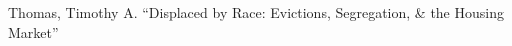 

\begin{cventries}

  \cventry
    { } %
{ } %
    { } %
    { } %
    {
      \begin{cvitems} %
        Thomas, Timothy A. ``Displaced by Race: Evictions, Segregation, \& the Housing Market''     
      \end{cvitems}
    }    


\end{cventries}

